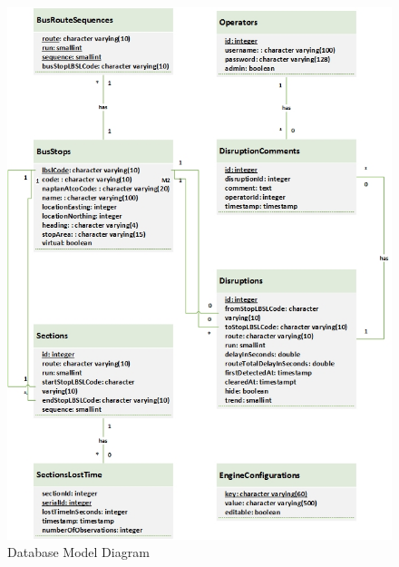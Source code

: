\begin{figure}[!htb]
\centering
	\includegraphics[scale=0.8]{Figures/DBModel.jpg}
\caption{Database Model Diagram\label{overflow}}
\end{figure}

